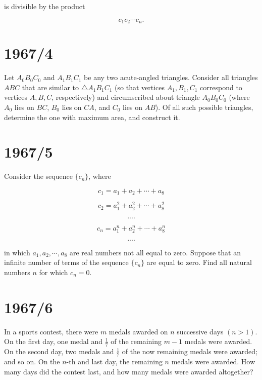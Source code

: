 \documentclass[12pt]{article}
\begin{document}
is divisible by the product

\begin{equation*}
c_1c_2 \cdots c_n.
\end{equation*}

\section*{1967/4}

Let $A_0B_0C_0$ and $A_1B_1C_1$ be any two acute-angled triangles. Consider all triangles $ABC$ that are similar to $\triangle A_1B_1C_1$ (so that vertices $A_1, B_1, C_1$ correspond to vertices $A, B, C$, respectively) and circumscribed about triangle $A_0B_0C_0$ (where $A_0$ lies on $BC$, $B_0$ lies on $CA$, and $C_0$ lies on $AB$). Of all such possible triangles, determine the one with maximum area, and construct it.

\section*{1967/5}

Consider the sequence $\{c_n\}$, where

\begin{equation*}
c_1=a_1+a_2+\cdots+a_8
\end{equation*}

\begin{equation*}
c_2=a_1^2+a_2^2+\cdots+a_8^2
\end{equation*}

\begin{equation*}
....
\end{equation*}

\begin{equation*}
c_n=a_1^n+a_2^n+\cdots+a_8^n
\end{equation*}

\begin{equation*}
....
\end{equation*}

in which $a_1, a_2, \cdots, a_8$ are real numbers not all equal to zero. Suppose that an infinite number of terms of the sequence $\{c_n\}$ are equal to zero. Find all natural numbers $n$ for which $c_n = 0$.

\section*{1967/6}

In a sports contest, there were $m$ medals awarded on $n$ successive days $(n > 1)$. On the first day, one medal and $\frac{1}{7}$ of the remaining $m-1$ medals were awarded. On the second day, two medals and $\frac{1}{7}$ of the now remaining medals were awarded; and so on. On the $n$-th and last day, the remaining $n$ medals were awarded. How many days did the contest last, and how many medals were awarded altogether?
\end{document}
